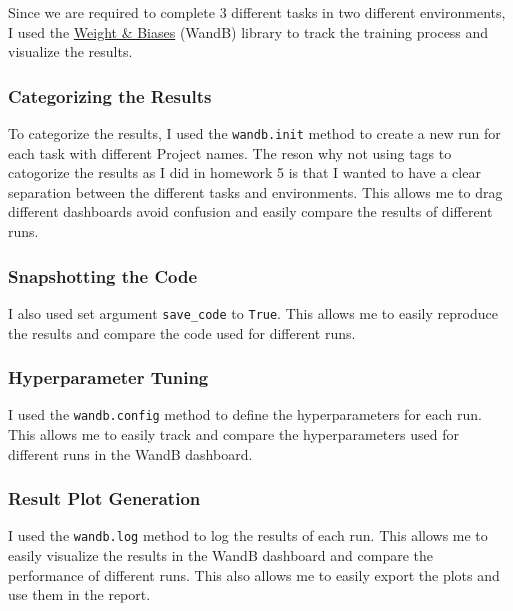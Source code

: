 Since we are required to complete 3 different tasks in two different environments, I used the \href{https://wandb.ai/site}{Weight \& Biases} (WandB) library to track the training process and visualize the results.

\subsubsection{Categorizing the Results}

To categorize the results, I used the \texttt{wandb.init} method to create a new run for each task with different Project names.
The reson why not using tags to catogorize the results as I did in homework 5 is that I wanted to have a clear separation between the different tasks and environments.
This allows me to drag different dashboards avoid confusion and easily compare the results of different runs.

\subsubsection{Snapshotting the Code}

I also used set argument \texttt{save\_code} to \texttt{True}.
This allows me to easily reproduce the results and compare the code used for different runs.

\subsubsection{Hyperparameter Tuning}

I used the \texttt{wandb.config} method to define the hyperparameters for each run.
This allows me to easily track and compare the hyperparameters used for different runs in the WandB dashboard.

\subsubsection{Result Plot Generation}

I used the \texttt{wandb.log} method to log the results of each run.
This allows me to easily visualize the results in the WandB dashboard and compare the performance of different runs.
This also allows me to easily export the plots and use them in the report.
